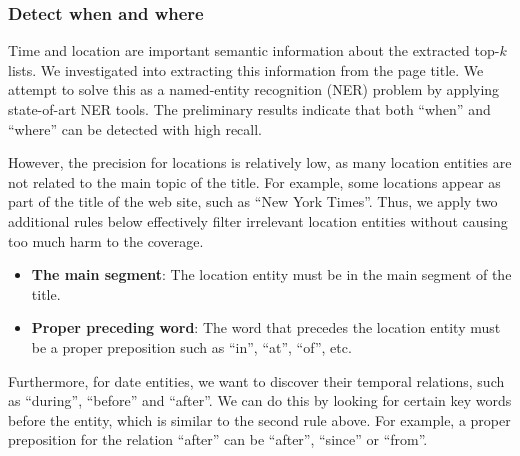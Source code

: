 

\subsubsection{Detect when and where}

Time and location are important semantic information about the extracted
top-$k$ lists. We investigated into extracting this information
from the page title.
We attempt to solve this as a named-entity recognition (NER) problem by
applying state-of-art NER tools\cite{finkel2005incorporating}. The preliminary results indicate that
both ``when'' and ``where'' can be detected with high recall.

However, the precision for locations is relatively low,
as many location entities are not related to the main topic of the title.
For example, some locations appear as part of the title of the web site,
such as ``New York Times''.
Thus, we apply two additional rules below
effectively filter irrelevant location entities
without causing too much harm to the coverage.

\begin{itemize}
  \item \textbf{The main segment}:
  The location entity must be in the main segment of the title.
  \item \textbf{Proper preceding word}:
  The word that precedes the location entity must be a proper preposition
  such as ``in'', ``at'', ``of'', etc.
\end{itemize}

Furthermore, for date entities, we want to discover their temporal
relations, such as ``during'', ``before'' and ``after''.
We can do this by looking for certain key words before the entity,
which is similar to the second rule above.
For example, a proper preposition for the relation ``after''
can be ``after'', ``since'' or ``from''.

